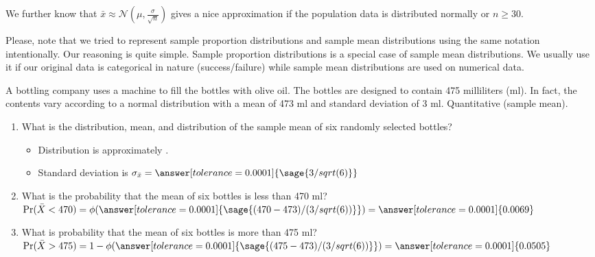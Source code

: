 \documentclass{ximera}
\begin{document}
We further know that $\bar x\approx \mathcal N(\mu,\frac{\sigma}{\sqrt{n}})$ gives a nice approximation if the population data is distributed normally or $n\geq 30$.

\begin{remark}
Please, note that we tried to represent sample proportion distributions and sample mean distributions using the same notation intentionally. Our reasoning is quite simple. Sample proportion distributions is a special case of sample mean distributions. We usually use it if our original data is categorical in nature (success/failure) while sample mean distributions are used on numerical data. 
\end{remark}

\begin{problem}
A bottling company uses a machine to fill the bottles with olive oil. The bottles are designed
to contain 475 milliliters (ml). In fact, the contents vary according to a normal distribution with
a mean of 473 ml and standard deviation of 3 ml. Quantitative (sample mean). 

    \begin{enumerate}
        \item What is the distribution, mean, and distribution of the sample mean of six randomly
selected bottles?

        \begin{itemize}
        \item Distribution is approximately .
        \item Standard deviation is $\sigma_{\bar x}=\answer[tolerance=0.0001]{\sage{3/sqrt(6)}}$
        \end{itemize}        
        
        \item  What is the probability that the mean of six bottles is less than 470 ml?
        $\Pr(\bar X<470)=\phi(\answer[tolerance=0.0001]{\sage{(470-473)/(3/sqrt(6))}})=\answer[tolerance=0.0001]{0.0069}$
        \item  What is probability that the mean of six bottles is more than 475 ml?
        $\Pr(\bar X>475)=1-\phi(\answer[tolerance=0.0001]{\sage{(475-473)/(3/sqrt(6))}})=\answer[tolerance=0.0001]{0.0505}$
    \end{enumerate}
\end{problem}
\end{document}
